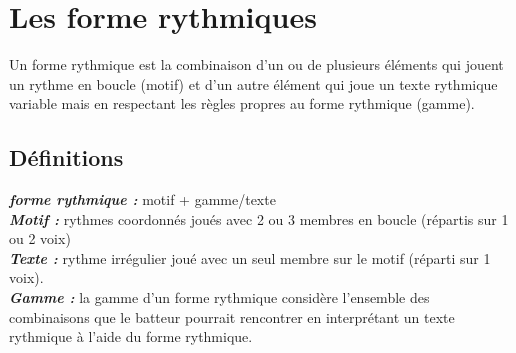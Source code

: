 \section{Les forme rythmiques}
\label{systemes_methodes}
Un forme rythmique est la combinaison d’un ou de plusieurs éléments qui jouent un rythme en boucle (motif) et d’un autre élément qui joue un texte rythmique variable mais en respectant les règles propres au forme rythmique (gamme).

\subsection*{Définitions}

\textit{\textbf{forme rythmique :}} motif + gamme/texte\\
\textit{\textbf{Motif :}} rythmes coordonnés joués avec 2 ou 3 membres en boucle (répartis sur 1 ou 2 voix)\\
\textit{\textbf{Texte :}} rythme irrégulier joué avec un seul membre sur le motif (réparti sur 1 voix).\\
\textit{\textbf{Gamme :}} la gamme d’un forme rythmique considère l’ensemble des combinaisons que le batteur pourrait rencontrer en interprétant un texte rythmique à l’aide du forme rythmique.

